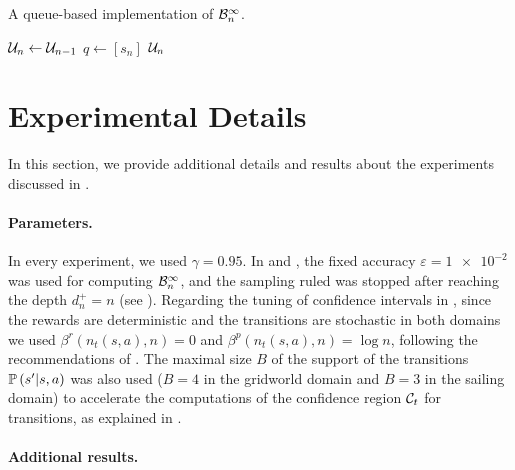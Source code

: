 \documentclass[runningheads]{llncs}
\begin{document}
\begin{algorithm}
	\caption{A queue-based implementation of $\mathcal{B}_n^\infty$.}
	\label{alg:queue-b-inf}
	\DontPrintSemicolon
	$\mathcal{U}_n \gets \mathcal{U}_{n-1}$\;
	$q\gets [s_n]$\;
	\Return $\mathcal{U}_n$\;
\end{algorithm}

\section{Experimental Details}

In this section, we provide additional details and results about the experiments discussed in .

\paragraph{Parameters.} In every experiment, we used $\gamma=0.95$. In \GBOPD and \GBOP, the fixed accuracy $\varepsilon=\num{1e-2}$ was used for computing $\mathcal{B}_n^\infty$, and the sampling ruled was stopped after reaching the depth $d^+_n = n$ (see ).
Regarding the tuning of confidence intervals in \GBOP, since the rewards are deterministic and the transitions are stochastic in both domains we used $\beta^r(n_t(s,a), n) = 0$ and $\beta^p(n_t(s,a), n) = \log n$, following the recommendations of \citep{Leurent2019practical,MDPGapE2020}. The maximal size $B$ of the support of the transitions $\mathbb{P}\left(s'|s,a\right)$ was also used ($B=4$ in the gridworld domain and $B=3$ in the sailing domain) to accelerate the computations of the confidence region $\mathcal{C}_t$ for transitions, as explained in \citep{MDPGapE2020}.

\paragraph{Additional results.}
\end{document}
